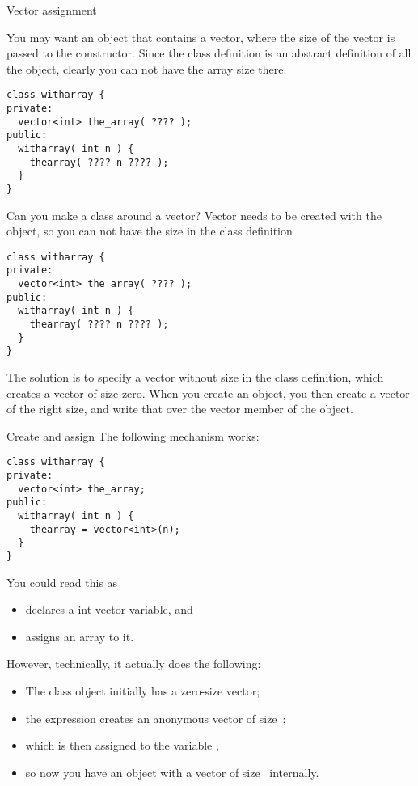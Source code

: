  {Vector assignment}

You may want an object that contains a vector, where the size of the
vector is passed to the constructor. Since the class definition is an
abstract definition of all the object, clearly you can not have the
array size there.

\begin{verbatim}
class witharray {
private:
  vector<int> the_array( ???? );
public:
  witharray( int n ) {
    thearray( ???? n ???? );
  }
}
\end{verbatim}

\begin{slide}{Can you make a class around a vector?}
  \label{sl:class-with-vector}
  Vector needs to be created with the object, so you can not have the
  size in the class definition
\begin{verbatim}
class witharray {
private:
  vector<int> the_array( ???? );
public:
  witharray( int n ) {
    thearray( ???? n ???? );
  }
}
\end{verbatim}
\end{slide}

The solution is to specify a vector without size in the class
definition, which creates a vector of size zero. When you create an
object, you then create a vector of the right size, and write that
over the vector member of the object.

\begin{block}{Create and assign}
  \label{sl:class-has-vector}
  The following mechanism works:
\begin{verbatim}
class witharray {
private:
  vector<int> the_array;
public:
  witharray( int n ) {
    thearray = vector<int>(n);
  }
}
\end{verbatim}
\end{block}

You could read this as
\begin{itemize}
\item {} declares a int-vector variable, and
\item {} assigns an array to it.
\end{itemize}
However, 
technically, it actually does the following:
\begin{itemize}
\item The class object initially has a zero-size vector;
\item the expression  creates an anonymous vector
  of size~;
\item which is then assigned to the variable ,
\item so now you have an object with a vector of size~ internally.
\end{itemize}

